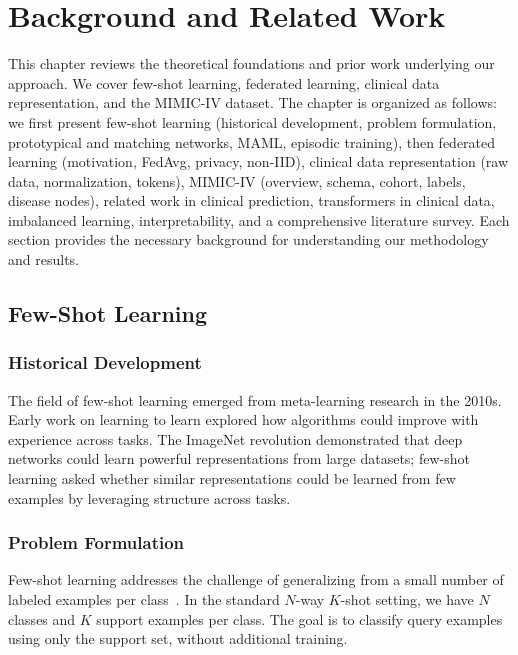 \chapter{Background and Related Work}
\label{ch:background}

This chapter reviews the theoretical foundations and prior work underlying our approach. We cover few-shot learning, federated learning, clinical data representation, and the MIMIC-IV dataset. The chapter is organized as follows: we first present few-shot learning (historical development, problem formulation, prototypical and matching networks, MAML, episodic training), then federated learning (motivation, FedAvg, privacy, non-IID), clinical data representation (raw data, normalization, tokens), MIMIC-IV (overview, schema, cohort, labels, disease nodes), related work in clinical prediction, transformers in clinical data, imbalanced learning, interpretability, and a comprehensive literature survey. Each section provides the necessary background for understanding our methodology and results.

\section{Few-Shot Learning}

\subsection{Historical Development}

The field of few-shot learning emerged from meta-learning research in the 2010s. Early work on learning to learn explored how algorithms could improve with experience across tasks. The ImageNet revolution demonstrated that deep networks could learn powerful representations from large datasets; few-shot learning asked whether similar representations could be learned from few examples by leveraging structure across tasks.

\subsection{Problem Formulation}

Few-shot learning addresses the challenge of generalizing from a small number of labeled examples per class~\cite{snell2017prototypical}. In the standard $N$-way $K$-shot setting, we have $N$ classes and $K$ support examples per class. The goal is to classify query examples using only the support set, without additional training.

